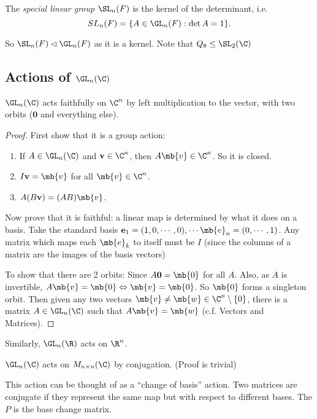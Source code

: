 \documentclass[a4paper]{article}
\begin{document}
  \begin{defi}
    The \emph{special linear group} $\SL_n(F)$ is the kernel of the determinant, i.e.
    \[
      SL_n(F) = \{A\in \GL_n(F): \det A = 1\}.
    \]
  \end{defi}

  So $\SL_n(F)\lhd \GL_n(F)$ as it is a kernel. Note that $Q_8\leq \SL_2(\C)$
  \subsection{Actions of \texorpdfstring{$\GL_n(\C)$}{GLn(C)}}
  \begin{prop}
    $\GL_n(\C)$ acts faithfully on $\C^n$ by left multiplication to the vector, with two orbits ($\mathbf{0}$ and everything else).
  \end{prop}

  \begin{proof}
    First show that it is a group action:
    \begin{enumerate}[label=\arabic{*}.]
        \setcounter{enumi}{0}
      \item If $A\in \GL_n(\C)$ and $\mathbf{v}\in \C^n$, then $A\mb{v}\in \C^n$. So it is closed.
      \item $I\mathbf{v} = \mb{v}$ for all $\mb{v}\in \C^n$.
      \item $A(B\mathbf{v}) = (AB)\mb{v}$.
    \end{enumerate}

    Now prove that it is faithful: a linear map is determined by what it does on a basis. Take the standard basis $\mathbf{e}_1 = (1, 0, \cdots, 0), \cdots \mb{e}_n = (0, \cdots, 1)$. Any matrix which maps each $\mb{e}_k$ to itself must be $I$ (since the columns of a matrix are the images of the basis vectors)

    To show that there are 2 orbits: Since $A\mathbf{0} = \mb{0}$ for all $A$. Also, as $A$ is invertible, $A\mb{v} = \mb{0}\Leftrightarrow \mb{v} = \mb{0}$. So $\mb{0}$ forms a singleton orbit. Then given any two vectors $\mb{v}\not= \mb{w}\in \C^n\setminus\{0\}$, there is a matrix $A\in \GL_n(\C)$ such that $A\mb{v} = \mb{w}$ (c.f. Vectors and Matrices).
  \end{proof}

  Similarly, $\GL_n(\R)$ acts on $\R^n$.

  \begin{prop}
    $\GL_n(\C)$ acts on $M_{n\times n}(\C)$ by conjugation. (Proof is trivial)
  \end{prop}
  This action can be thought of as a ``change of basis'' action. Two matrices are conjugate if they represent the same map but with respect to different bases. The $P$ is the base change matrix.
\end{document}
